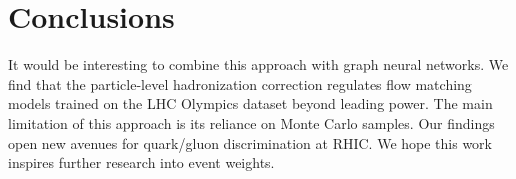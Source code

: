 \section{Conclusions}\label{sec:conclusions}

It would be interesting to combine this approach with graph neural
networks. We find that the particle-level hadronization correction
regulates flow matching models trained on the LHC Olympics dataset
beyond leading power. The main limitation of this approach is its
reliance on Monte Carlo samples. Our findings open new avenues for
quark/gluon discrimination at RHIC. We hope this work inspires further
research into event weights.

